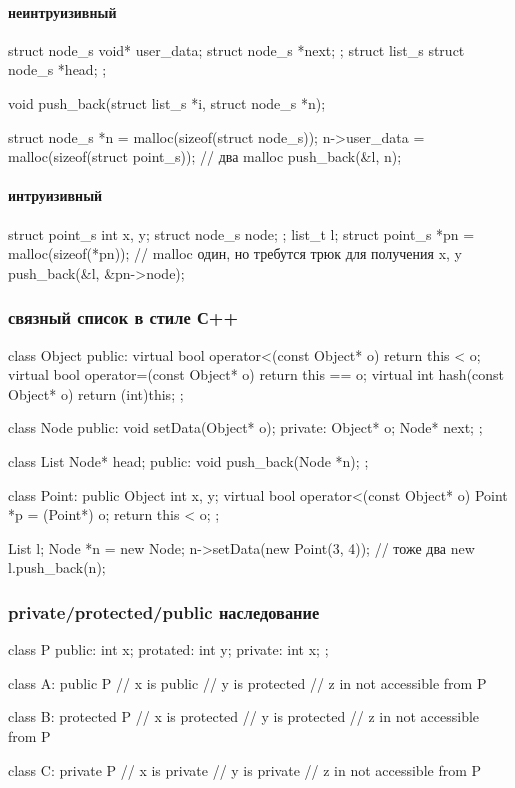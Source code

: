 \paragraph{неинтруизивный}
\begin{ccode}
struct node_s {
    void* user_data;
    struct node_s *next;
};
struct list_s {
    struct node_s *head;
};

void push_back(struct list_s *i, struct node_s *n);
\end{ccode}
\begin{ccode}
struct node_s *n = malloc(sizeof(struct node_s));
n->user_data = malloc(sizeof(struct point_s));
// два malloc
push_back(&l, n);
\end{ccode}
\paragraph{интруизивный}
\begin{ccode}
struct point_s {
    int x, y;
    struct node_s node;
};
list_t l;
struct point_s *pn = malloc(sizeof(*pn));
// malloc один, но требутся трюк для получения x, y
push_back(&l, &pn->node);
\end{ccode}
\subsubsection{связный список в стиле С++}
\begin{cppcode}
class Object {
public:
    virtual bool operator<(const Object* o) {
	return this < o;
    }
    virtual bool operator=(const Object* o) {
	return this == o;
    }
    virtual int hash(const Object* o) {
	return (int)this;
    }
};

class Node {
public:
    void setData(Object* o);
private:
    Object* o;
    Node* next;
};

class List {
    Node* head;
public:
    void push_back(Node *n);
};

class Point: public Object {
    int x, y;
    virtual bool operator<(const Object* o) {
	Point *p = (Point*) o;
	return this < o;
    }
};
\end{cppcode}
\begin{cppcode}
List l;
Node *n = new Node;
n->setData(new Point(3, 4));
// тоже два new
l.push_back(n);
\end{cppcode}
\subsubsection{private/protected/public наследование}
\begin{cppcode}
class P {
public:
    int x;
protated:
    int y;
private:
    int x;
};
\end{cppcode}
\begin{cppcode}
class A: public P {
    // x is public
    // y is protected
    // z in not accessible from P
}

class B: protected P {
    // x is protected
    // y is protected
    // z in not accessible from P
}

class C: private P {
    // x is private
    // y is private
    // z in not accessible from P
}
\end{cppcode}
